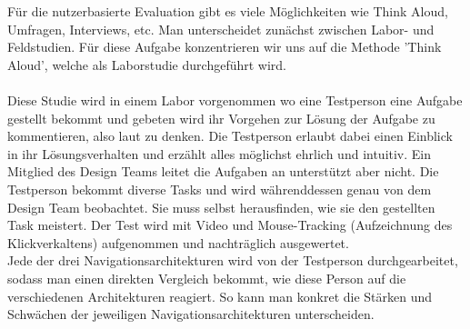 Für die nutzerbasierte Evaluation gibt es viele Möglichkeiten
wie Think Aloud, Umfragen, Interviews, etc. Man unterscheidet zunächst zwischen
Labor- und Feldstudien.
Für diese Aufgabe konzentrieren wir uns auf die Methode 'Think Aloud', welche
als Laborstudie durchgeführt wird.
\\ \\
Diese Studie wird in einem Labor vorgenommen wo eine Testperson eine Aufgabe gestellt
bekommt und gebeten wird ihr Vorgehen zur Lösung der Aufgabe zu kommentieren, also laut zu denken. 
Die Testperson erlaubt dabei einen Einblick in ihr Lösungsverhalten und erzählt alles möglichst ehrlich
und intuitiv. 
Ein Mitglied des Design Teams leitet die Aufgaben an unterstützt aber nicht.
Die Testperson bekommt diverse Tasks und wird währenddessen genau von dem Design Team beobachtet.
Sie muss selbst herausfinden, wie sie den gestellten Task meistert.
Der Test wird mit Video und Mouse-Tracking (Aufzeichnung des Klickverkaltens) 
aufgenommen und nachträglich ausgewertet.
\\ 
Jede der drei Navigationsarchitekturen wird von der Testperson durchgearbeitet, sodass
man einen direkten Vergleich bekommt, wie diese Person auf die verschiedenen Architekturen reagiert.
So kann man konkret die Stärken und Schwächen der jeweiligen Navigationsarchitekturen unterscheiden.
